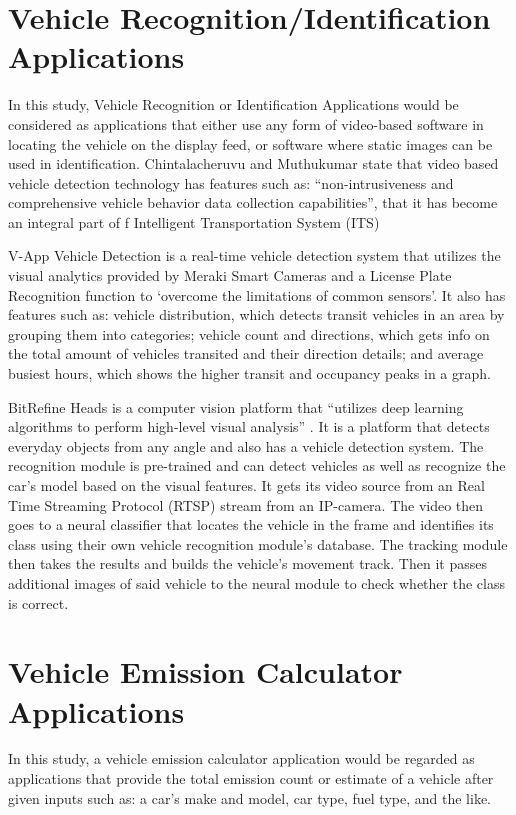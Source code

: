 \section{Vehicle Recognition/Identification Applications}
	
	In this study, Vehicle Recognition or Identification Applications would be considered as applications that either use any form of video-based software in locating the vehicle on the display feed, or software where static images can be used in identification. Chintalacheruvu and Muthukumar \citeyear{chintalacheruvu_2012} state that video based vehicle detection technology has features such as: “non-intrusiveness and comprehensive vehicle behavior data collection capabilities”, that it has become an integral part of f Intelligent Transportation System (ITS)

	V-App Vehicle Detection is a real-time vehicle detection system that utilizes the visual analytics provided by Meraki Smart Cameras and a License Plate Recognition function to ‘overcome the limitations of common sensors’. It also has features such as: vehicle distribution, which detects transit vehicles in an area by grouping them into categories; vehicle count and directions, which gets info on the total amount of vehicles transited and their direction details; and average busiest hours, which shows the higher transit and occupancy peaks in a graph. \cite{VAPP_ND}

	BitRefine Heads is a computer vision platform that “utilizes deep learning algorithms to perform high-level visual analysis” . It is a platform that detects everyday objects from any angle and also has a vehicle detection system. The recognition module is pre-trained and can detect vehicles as well as recognize the car’s model based on the visual features. It gets its video source from an Real Time Streaming Protocol (RTSP) stream from an IP-camera. The video then goes to a neural classifier that locates the vehicle in the frame and identifies its class using their own vehicle recognition module’s database.  The tracking module then takes the results and builds the vehicle’s movement track. Then it passes additional images of said vehicle to the neural module to check whether the class is correct. \cite{BITREFINE_ND}


\section{Vehicle Emission Calculator Applications}
	In this study, a vehicle emission calculator application would be regarded as applications that provide the total emission count or estimate of a vehicle after given inputs such as: a car’s make and model, car type, fuel type, and the like.
	
